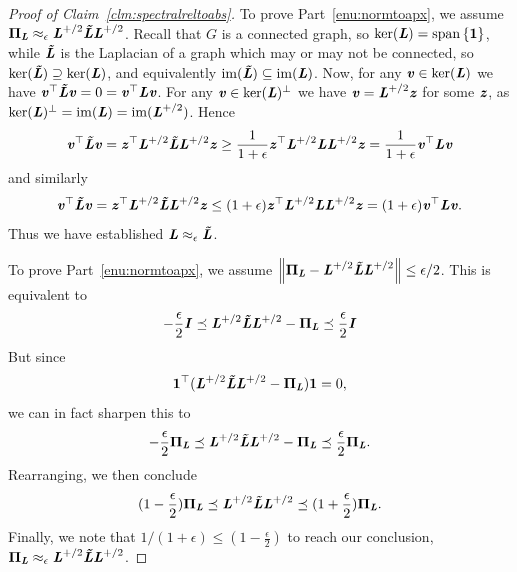 \begin{proof}[Proof of Claim~\ref{clm:spectralreltoabs}]
  To prove Part~\ref{enu:normtoapx}, we
  assume $\PPi_{\LL} \approx_{\epsilon}
  \LL^{\pinv/2}\LLtil\LL^{\pinv/2}$.
  Recall that $G$ is a connected graph, so $\ker(\LL) =
  \Span\setof{\vecone}$, while $\LLtil$ is the Laplacian of a graph
which may or may not be connected, so $\ker(\LLtil) \supseteq
\ker(\LL)$, and equivalently $\im(\LLtil) \subseteq \im(\LL)$.
  Now, for any $\vv \in \ker(\LL)$ we have
  $\vv^{\trp} \LLtil \vv = 0 = \vv^{\trp} \LL \vv$.
  For any $\vv \in \ker(\LL)^{\perp}$ we have
  $\vv = \LL^{\pinv/2} \zz$ for some $\zz$, as $\ker(\LL)^{\perp} =
  \im(\LL) = \im(\LL^{\pinv/2})$.
  Hence
  \[
    \vv^{\trp} \LLtil \vv =
    \zz^{\trp} \LL^{\pinv/2}\LLtil\LL^{\pinv/2} \zz
    \geq
    \frac{1}{1+\epsilon}
     \zz^{\trp} \LL^{\pinv/2}\LL\LL^{\pinv/2} \zz
     =
     \frac{1}{1+\epsilon}
     \vv^{\trp} \LL \vv
   \]
and similarly
    \[
    \vv^{\trp} \LLtil \vv =
    \zz^{\trp} \LL^{\pinv/2}\LLtil\LL^{\pinv/2} \zz
    \leq
    (1+\epsilon)
     \zz^{\trp} \LL^{\pinv/2}\LL\LL^{\pinv/2} \zz
     =
    (1+\epsilon)
    \vv^{\trp} \LL \vv
    .
  \]
  Thus we have established  $\LL \approx_{\epsilon} \LLtil$.



  To prove Part~\ref{enu:normtoapx}, we assume $\norm{\PPi_{\LL} - \LL^{\pinv/2}\LLtil\LL^{\pinv/2}} \leq
  \epsilon/2$.
  This is equivalent to
  \[
   - \frac{\epsilon}{2} \II \preceq
    \LL^{\pinv/2}\LLtil\LL^{\pinv/2} - \PPi_{\LL} \preceq \frac{\epsilon}{2} \II
    \]
 But since
  \[
    \vecone^{\trp} (\LL^{\pinv/2}\LLtil\LL^{\pinv/2} - \PPi_{\LL})
    \vecone = 0,
  \]
  we can in fact sharpen this to
    \[
      - \frac{\epsilon}{2} \PPi_{\LL}
      \preceq
      \LL^{\pinv/2}\LLtil\LL^{\pinv/2} - \PPi_{\LL}
      \preceq
    \frac{\epsilon}{2} \PPi_{\LL}
    .
    \]
 Rearranging, we then conclude
 \[
   (1-\frac{\epsilon}{2}) \PPi_{\LL}
   \preceq
   \LL^{\pinv/2}\LLtil\LL^{\pinv/2}
    \preceq
    (1+\frac{\epsilon}{2}) \PPi_{\LL}
    .
  \]
Finally, we note that $1/(1+\epsilon) \leq (1-\frac{\epsilon}{2})$ to
reach our conclusion, $\PPi_{\LL} \approx_{\epsilon} \LL^{\pinv/2}\LLtil\LL^{\pinv/2}$.
\end{proof}

